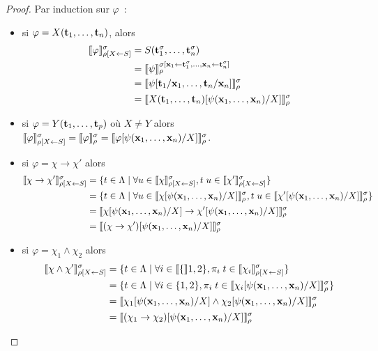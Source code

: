 \documentclass{article}
\begin{document}
\begin{proof}
  Par induction sur $\varphi$~:
  \begin{itemize}
  \item si $\varphi = X(\mathbf{t}_1,\ldots,\mathbf{t}_n)$, alors
    \begin{align*}
      \llbracket \varphi \rrbracket_{\rho[X\leftarrow S]}^\sigma &= S(\mathbf{t}_1^\sigma,\ldots,\mathbf{t}_n^\sigma) \\
      &= \llbracket \psi \rrbracket_\rho^{\sigma[\mathbf{x}_1\leftarrow \mathbf{t}_1^\sigma,\ldots,\mathbf{x}_n\leftarrow \mathbf{t}_n^\sigma]} \\
      &= \llbracket \psi[\mathbf{t}_1/\mathbf{x}_1,\ldots,\mathbf{t}_n/\mathbf{x}_n] \rrbracket_\rho^\sigma\\
      &= \llbracket X(\mathbf{t}_1,\ldots,\mathbf{t}_n)[\psi(\mathbf{x}_1,\ldots,\mathbf{x}_n)/X] \rrbracket_\rho^\sigma
    \end{align*}
  \item si $\varphi = Y(\mathbf{t}_1,\ldots,\mathbf{t}_p)$ où $X\neq Y$ alors $\llbracket \varphi \rrbracket_{\rho[X\leftarrow S]}^\sigma = \llbracket \varphi \rrbracket_\rho^\sigma = \llbracket \varphi[\psi(\mathbf{x}_1,\ldots,\mathbf{x}_n)/X] \rrbracket_\rho^\sigma$.
  \item si $\varphi = \chi \to \chi'$ alors
    \begin{align*}
      \llbracket \chi\to\chi' \rrbracket_{\rho[X\leftarrow S]}^\sigma &= \{t\in\Lambda\mid \forall u \in \llbracket \chi \rrbracket_{\rho[X\leftarrow S]}^\sigma, t\;u\in \llbracket \chi' \rrbracket_{\rho[X\leftarrow S]}^\sigma\}\\
      &= \{t\in\Lambda\mid \forall u \in \llbracket \chi[\psi(\mathbf{x}_1,\ldots,\mathbf{x}_n)/X] \rrbracket_\rho^\sigma, t\;u\in\llbracket \chi'[\psi(\mathbf{x}_1,\ldots,\mathbf{x}_n)/X] \rrbracket_\rho^\sigma\}\\
      &= \llbracket \chi[\psi(\mathbf{x}_1,\ldots,\mathbf{x}_n)/X] \to \chi'[\psi(\mathbf{x}_1,\ldots,\mathbf{x}_n)/X] \rrbracket_\rho^\sigma\\
      &= \llbracket (\chi\to\chi')[\psi(\mathbf{x}_1,\ldots,\mathbf{x}_n)/X] \rrbracket_\rho^\sigma
    \end{align*}
  \item si $\varphi = \chi_1\land\chi_2$ alors
    \begin{align*}
      \trad{\chi\land\chi'}_{\rho[X\leftarrow S]}^\sigma &= \{t\in\Lambda\mid \forall i \in \trad\{1,2\}, \pi_i\;t\in \trad{\chi_i}_{\rho[X\leftarrow S]}^\sigma\}\\
      &= \{t\in\Lambda\mid \forall i \in \{1,2\}, \pi_i\;t\in\trad{\chi_i[\psi(\bx_1,\ldots,\bx_n)/X]}_\rho^\sigma\}\\
      &= \trad{\chi_1[\psi(\bx_1,\ldots,\bx_n)/X] \land \chi_2[\psi(\bx_1,\ldots,\bx_n)/X]}_\rho^\sigma\\
      &= \trad{(\chi_1\to\chi_2)[\psi(\bx_1,\ldots,\bx_n)/X]}_\rho^\sigma

\end{align*}
\end{itemize}
\end{proof}
\end{document}
